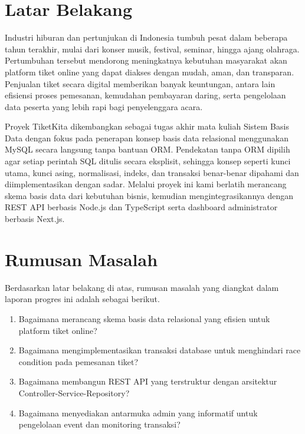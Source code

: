 \documentclass[12pt,a4paper]{report}
\begin{document}
\section{Latar Belakang}
Industri hiburan dan pertunjukan di Indonesia tumbuh pesat dalam beberapa tahun terakhir, mulai dari konser musik, festival, seminar, hingga ajang olahraga. Pertumbuhan tersebut mendorong meningkatnya kebutuhan masyarakat akan platform tiket online yang dapat diakses dengan mudah, aman, dan transparan. Penjualan tiket secara digital memberikan banyak keuntungan, antara lain efisiensi proses pemesanan, kemudahan pembayaran daring, serta pengelolaan data peserta yang lebih rapi bagi penyelenggara acara.

Proyek TiketKita dikembangkan sebagai tugas akhir mata kuliah Sistem Basis Data dengan fokus pada penerapan konsep basis data relasional menggunakan MySQL secara langsung tanpa bantuan ORM. Pendekatan tanpa ORM dipilih agar setiap perintah SQL ditulis secara eksplisit, sehingga konsep seperti kunci utama, kunci asing, normalisasi, indeks, dan transaksi benar-benar dipahami dan diimplementasikan dengan sadar. Melalui proyek ini kami berlatih merancang skema basis data dari kebutuhan bisnis, kemudian mengintegrasikannya dengan REST API berbasis Node.js dan TypeScript serta dashboard administrator berbasis Next.js.

\section{Rumusan Masalah}
Berdasarkan latar belakang di atas, rumusan masalah yang diangkat dalam laporan progres ini adalah sebagai berikut.
\begin{enumerate}
    \item Bagaimana merancang skema basis data relasional yang efisien untuk platform tiket online?
    \item Bagaimana mengimplementasikan transaksi database untuk menghindari race condition pada pemesanan tiket?
    \item Bagaimana membangun REST API yang terstruktur dengan arsitektur Controller-Service-Repository?
    \item Bagaimana menyediakan antarmuka admin yang informatif untuk pengelolaan event dan monitoring transaksi?
\end{enumerate}
\end{document}
